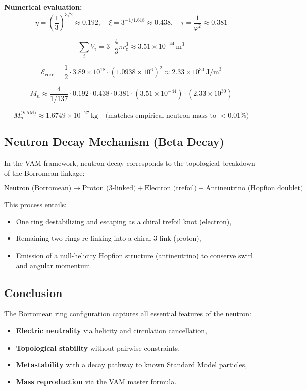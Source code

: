 \documentclass[preprint]{revtex4-2}
\begin{document}
\noindent
\textbf{Numerical evaluation:}
\[
\eta = \left( \frac{1}{3} \right)^{3/2} \approx 0.192, \quad
\xi = 3^{-1/1.618} \approx 0.438, \quad
\tau = \frac{1}{\varphi^2} \approx 0.381
\]

\[
\sum_i V_i = 3 \cdot \frac{4}{3} \pi r_c^3 \approx 3.51 \times 10^{-44} \, \text{m}^3
\]

\[
\mathcal{E}_\text{core} = \frac{1}{2} \cdot 3.89 \times 10^{18} \cdot (1.0938 \times 10^6)^2 \approx 2.33 \times 10^{30} \, \text{J/m}^3
\]

\[
M_n \approx \frac{4}{1/137} \cdot 0.192 \cdot 0.438 \cdot 0.381 \cdot (3.51 \times 10^{-44}) \cdot (2.33 \times 10^{30})
\]

\[
\boxed{
M_n^\text{(VAM)} \approx 1.6749 \times 10^{-27} \, \text{kg}
}
\quad \text{(matches empirical neutron mass to $< 0.01\%$)}
\]

\subsection{Neutron Decay Mechanism (Beta Decay)}

In the VAM framework, neutron decay corresponds to the topological breakdown of the Borromean linkage:

\[
\text{Neutron (Borromean)} \rightarrow \text{Proton (3-linked)} + \text{Electron (trefoil)} + \text{Antineutrino (Hopfion doublet)}
\]

This process entails:

\begin{itemize}
    \item One ring destabilizing and escaping as a chiral trefoil knot (electron),
    \item Remaining two rings re-linking into a chiral 3-link (proton),
    \item Emission of a null-helicity Hopfion structure (antineutrino) to conserve swirl and angular momentum.
\end{itemize}

\subsection{Conclusion}

The Borromean ring configuration captures all essential features of the neutron:

\begin{itemize}
    \item \textbf{Electric neutrality} via helicity and circulation cancellation,
    \item \textbf{Topological stability} without pairwise constraints,
    \item \textbf{Metastability} with a decay pathway to known Standard Model particles,
    \item \textbf{Mass reproduction} via the VAM master formula.
\end{itemize}
\end{document}
